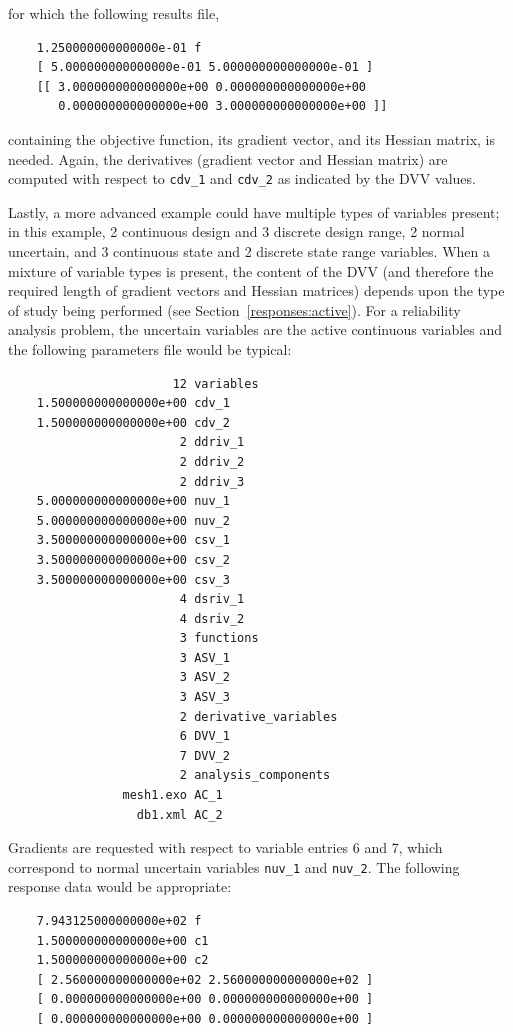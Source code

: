 for which the following results file,
\begin{small}
\begin{verbatim}
    1.250000000000000e-01 f
    [ 5.000000000000000e-01 5.000000000000000e-01 ]
    [[ 3.000000000000000e+00 0.000000000000000e+00
       0.000000000000000e+00 3.000000000000000e+00 ]]
\end{verbatim}
\end{small}
containing the objective function, its gradient vector, and its
Hessian matrix, is needed.  Again, the derivatives (gradient vector
and Hessian matrix) are computed with respect to \texttt{cdv\_1} and
\texttt{cdv\_2} as indicated by the DVV values.

Lastly, a more advanced example could have multiple types of variables
present; in this example, 2 continuous design and 3 discrete design
range, 2 normal uncertain, and 3 continuous state and 2 discrete state
range variables.  When a mixture of variable types is present, the
content of the DVV (and therefore the required length of gradient
vectors and Hessian matrices) depends upon the type of study being
performed (see Section~\ref{responses:active}).  For a reliability
analysis problem, the uncertain variables are the active continuous
variables and the following parameters file would be typical:
\begin{small}
\begin{verbatim}
                       12 variables
    1.500000000000000e+00 cdv_1
    1.500000000000000e+00 cdv_2
                        2 ddriv_1
                        2 ddriv_2
                        2 ddriv_3
    5.000000000000000e+00 nuv_1
    5.000000000000000e+00 nuv_2
    3.500000000000000e+00 csv_1
    3.500000000000000e+00 csv_2
    3.500000000000000e+00 csv_3
                        4 dsriv_1
                        4 dsriv_2
                        3 functions
                        3 ASV_1
                        3 ASV_2
                        3 ASV_3
                        2 derivative_variables
                        6 DVV_1
                        7 DVV_2
                        2 analysis_components
                mesh1.exo AC_1
                  db1.xml AC_2
\end{verbatim}
\end{small}

Gradients are requested with respect to variable entries 6 and 7,
which correspond to normal uncertain variables \texttt{nuv\_1} and
\texttt{nuv\_2}.  The following response data would be appropriate:
\begin{small}
\begin{verbatim}
    7.943125000000000e+02 f
    1.500000000000000e+00 c1
    1.500000000000000e+00 c2
    [ 2.560000000000000e+02 2.560000000000000e+02 ]
    [ 0.000000000000000e+00 0.000000000000000e+00 ]
    [ 0.000000000000000e+00 0.000000000000000e+00 ]
\end{verbatim}
\end{small}

